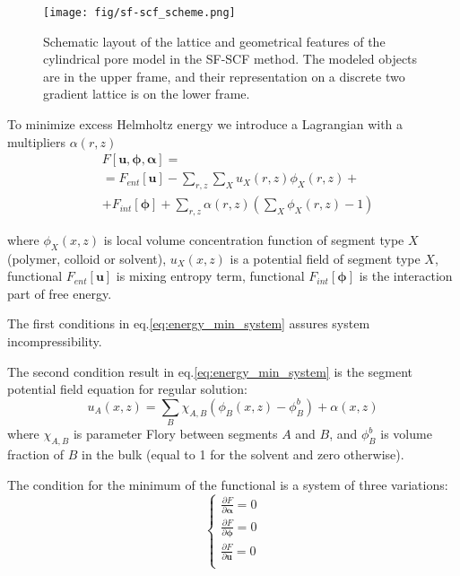 \documentclass[10pt, a4paper]{article}
\begin{document}
\begin{multicols}{2}
\begin{figure}[H]
    \centering
    \texttt{[image: fig/sf-scf\_scheme.png]}
    \caption{
    Schematic layout of the lattice and geometrical features of the cylindrical pore model in the SF-SCF method.
    The modeled objects are in the upper frame, and their representation on a discrete two gradient lattice is on the lower frame.
    }
\label{fig:sf-scf_scheme}
\end{figure}

To minimize excess Helmholtz energy we introduce a Lagrangian with a multipliers $\alpha(r,z)$
\begin{equation}
    \label{eq:fe_lagrangian}
    \begin{aligned}
    &F[\mathbf{u}, \boldsymbol{\phi}, \boldsymbol{\alpha}] =\\
    &= F_{ent}[\mathbf{u}] - \sum\limits_{r,z} \sum\limits_X u_X(r, z) \phi_X(r, z) + \\
    &+ F_{int} [\boldsymbol{\phi}] 
    + \sum\limits_{r,z} \alpha(r, z) \left( \sum\limits_X \phi_X(r, z) - 1 \right)
    \end{aligned} 
\end{equation}

where $\phi_X(x, z)$ is local volume concentration function of segment type $X$ (polymer, colloid or solvent), $u_X(x, z)$ is a potential field of segment type $X$, functional $F_{ent}[\mathbf{u}]$ is mixing entropy term, functional $F_{int} [\boldsymbol{\phi}]$ is the interaction part of free energy. 


The first conditions in eq.\ref{eq:energy_min_system} assures system incompressibility.


The second condition result in eq.\ref{eq:energy_min_system} is the segment potential field equation for regular solution:
\begin{equation}
    \label{eq:u-phi}
    u_A(x, z) =\sum\limits_{B} \chi_{A,B} \left(\phi_B(x,z) - \phi_B^b \right) + \alpha(x, z)
\end{equation}
where $\chi_{A,B}$ is parameter Flory between segments $A$ and $B$, and $\phi_B^b$ is volume fraction of $B$ in the bulk (equal to 1 for the solvent and zero otherwise).


The condition for the minimum of the functional is a system of three variations:
\begin{equation}
    \label{eq:energy_min_system}
    \begin{cases}
        \frac{\partial F}{\partial \boldsymbol{\alpha}} = 0 \\
        \frac{\partial F}{\partial \boldsymbol{\phi}} = 0 \\
        \frac{\partial F}{\partial \mathbf{u}} = 0 \\
    \end{cases}
\end{equation}


\end{multicols}
\end{document}
